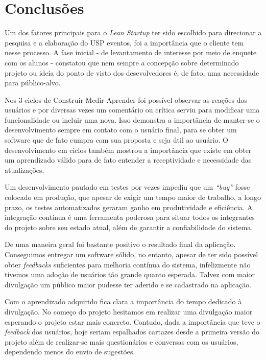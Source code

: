 \chapter{Conclusões}
\label{cap:conclusoes}

\par Um dos fatores principais para o \emph{Lean Startup} ter sido escolhido para direcionar a pesquisa e a elaboração do USP eventos, foi a importância que o cliente tem nesse processo. A fase inicial - de levantamento de interesse por meio de enquete com os alunos - constatou que nem sempre a concepção sobre determinado projeto ou ideia do ponto de visto dos desevolvedores é, de fato, uma necessidade para público-alvo.

\par Nos 3 ciclos de Construir-Medir-Aprender foi possível observar as reações dos usuários e por diversas vezes um comentário ou crítica serviu para modificar uma funcionalidade ou incluir uma nova. Isso demonstra a importância de manter-se o desenvolvimento sempre em contato com o usuário final, para se obter um software que de fato cumpra com sua proposta e seja útil ao usuário. O desenvolvimento em ciclos também mostrou a importância que existe em obter um aprendizado válido para de fato entender a receptividade e necessidade das atualizações.

\par Um desenvolvimento pautado em testes por vezes impediu que um \emph{``bug''} fosse colocado em produção, que apesar de exigir um tempo maior de trabalho, a longo prazo, os testes automatizados geraram ganho em produtividade e eficiência. A integração contínua é uma ferramenta poderosa para situar todos os integrantes do projeto sobre seu estado atual, além de garantir a confiabilidade do sistema.

\par De uma maneira geral foi bastante positivo o resultado final da aplicação. Conseguimos entregar um software sólido, no entanto, apesar de ter sido possível obter \emph{feedbacks} suficientes para melhoria contínua do sistema, infelizmente não tivemos uma adoção de usuários tão grande quanto esperada. Talvez com maior divulgação um público maior pudesse ter aderido e se cadastrado na aplicação.

\par Com o aprendizado adquirido fica clara a importância do tempo dedicado à divulgação. No começo do projeto hesitamos em realizar uma divulgação maior esperando o projeto estar mais concreto. Contudo, dada a importância que teve o \emph{feedback} dos usuários, hoje seriam espalhados cartazes desde a primeira versão do projeto além de realizar-se mais questionários e conversas com os usuários, dependendo menos do envio de sugestões.

